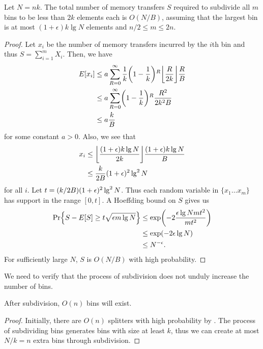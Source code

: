 \begin{theorem}
  Let $N=nk$.  The total number of memory transfers $S$ required to subdivide all $m$ bins to be less
  than $2k$ elements each is $O(N/B)$, assuming that the largest bin is at most 
  $(1+\epsilon)k\lg N$ elements and $n/2 \leq m \leq 2n$.
\end{theorem}
\begin{proof}
  Let $x_i$ be the number of memory transfers incurred by the $i$th bin and
  thus $S=\sum_{i=1}^{m}X_i$.  Then, we have 
  \begin{align*}
    E[x_i] & \leq a \sum_{R=0}^{\infty} \frac{1}{k}\mathopen{}\left(1-\frac{1}{k}\right)\mathclose{}^R \mathopen{}\left\lfloor \frac{R}{2k} \right\rfloor\mathclose{} \frac{R}{B}\\
    & \leq a \sum_{R=0}^{\infty} \mathopen{}\left(1-\frac{1}{k}\right)\mathclose{}^R \frac{R^2}{2k^2B}\\
    & \leq a\frac{k}{B}\\
  \end{align*}
  for some constant $a>0$.
  Also, we see that
  \begin{align*}
    x_i &\leq \mathopen{}\left\lfloor \frac{(1+\epsilon)k\lg N}{2k} \right\rfloor\mathclose{}\frac{(1+\epsilon)k\lg N}{B}\\
    &\leq \frac{k}{2B}(1+\epsilon)^2 \lg ^2 N \\
  \end{align*}
  for all $i$.  Let $t = \mathopen{}\left(k/2B\right)\mathclose{}(1+\epsilon)^2 \lg ^2 N$.  
  Thus each random variable in $\{ x_1 \ldots x_m \}$ has support
  in the range $[0, t]$.
  A Hoeffding bound on $S$ gives us
  \begin{align*}
    \Pr\mathopen{}\left\{ S - E[S] \geq t \sqrt{\epsilon m \lg N} \right\}\mathclose{} & \leq \exp \mathopen{}\left(-2\frac{\epsilon \lg N m t^2}{mt^2}\right)\mathclose{}\\
    & \leq \exp \mathopen{}\left(-2\epsilon \lg N\right)\mathclose{}\\
    & \leq N^{-\epsilon}.\\
  \end{align*}
  For sufficiently large $N$, $S$ is $O(N/B)$ with high probability.
\end{proof}

We need to verify that the process of subdivision does not unduly increase the number
of bins.

\begin{lemma}
After subdivision, $O(n)$ bins will exist.
\end{lemma}
\begin{proof}
Initially, there are $O(n)$ splitters with high probability by .
The process of subdividing bins generates bins with size at least $k$, thus we
can create at most $N/k = n$ extra bins through subdivision.
\end{proof}

